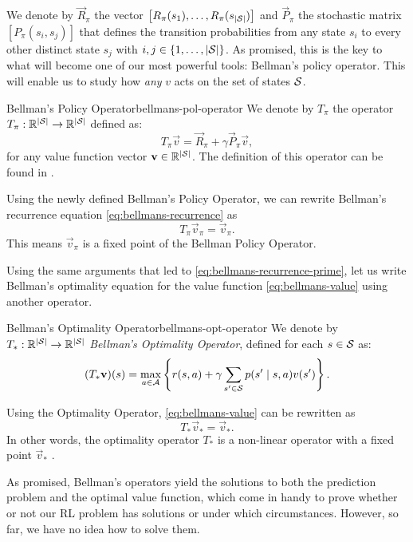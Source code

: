 We denote by $\vec{R}_\pi$ the vector $\left[ R_\pi(s_1), \dots, R_\pi
(s_{|\mathcal{S}|}) \right]$ and $\vec{P}_\pi$ the stochastic matrix $\left[
P_\pi(s_i, s_j) \right]$ that defines the transition probabilities from any
state $s_i$ to every other distinct state $s_j$ with $i, j \in \left\{ 1, \dots,
|\mathcal{S}| \right\}$. As promised, this is the key to what will become one of our
most powerful tools: Bellman's policy operator.  This will enable us to study
how \textit{any} $v$ acts on the set of states $\mathcal{S}$.

\begin{dfn}{Bellman's Policy Operator}{bellmans-pol-operator}
    We denote by $T_\pi$ the operator $T_\pi: \mathbb{R}^{|\mathcal{S}|} \to \mathbb{R}^{|\mathcal{S}|}$
    defined as:
    \[
        T_\pi \vec{v} = \vec{R}_\pi + \gamma \vec{P}_\pi \vec{v},
    \]
    for any value function vector $\mathbf{v} \in \mathbb{R}^{|\mathcal{S}|}$. The definition
    of this operator can be found in \cite[Ch.~5.4]{raoRL4F}.
\end{dfn}

Using the newly defined Bellman's Policy Operator, we can rewrite Bellman's
recurrence equation \eqref{eq:bellmans-recurrence} as
\[
    T_\pi \vec{v}_\pi = \vec{v}_\pi.
\]
This means $\vec{v}_\pi$ is a fixed point of the Bellman Policy Operator.

Using the same arguments that led to \eqref{eq:bellmans-recurrence-prime}, let
us write Bellman's optimality equation for the value function
\eqref{eq:bellmans-value} using another operator.

\begin{dfn}{Bellman's Optimality Operator}{bellmans-opt-operator}
    We denote by $T_*: \mathbb{R}^{|\mathcal{S}|} \to \mathbb{R}^{|\mathcal{S}|}$ \emph{Bellman's Optimality Operator}, defined for each $s \in \mathcal{S}$ as:
    \[
        (T_{*} \mathbf{v})(s) = \max_{a \in \mathcal{A}} \left\{ r(s, a) + \gamma \sum_{s' \in \mathcal{S}} p(s' \mid s, a) v(s') \right\}. 
    \]
\end{dfn}

Using the Optimality Operator, \eqref{eq:bellmans-value} can be rewritten as
\begin{equation}
    \label{eq:bellmans-optimality-operators}
    T_* \vec{v}_{*} = \vec{v}_{*}.
\end{equation}
In other words, the optimality operator $T_*$ is a non-linear operator with a
fixed point $\vec{v}_*$ \cite[Ch.~5.4]{raoRL4F}.

As promised, Bellman's operators yield the solutions to both the prediction
problem and the optimal value function, which come in handy to prove whether or
not our RL problem has solutions or under which circumstances. However, so far,
we have no idea how to solve them.

